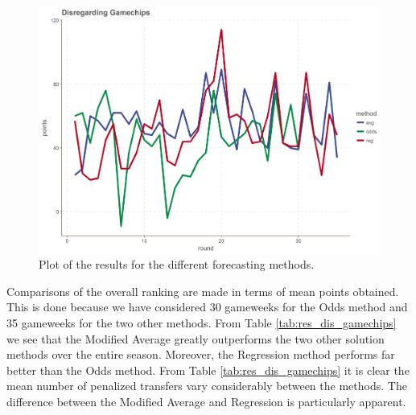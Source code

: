 \begin{figure}[H]
    \centering
    \includegraphics[scale=0.5]{fig/chapter_7/comparison_methods.png}
    \caption{Plot of the results for the different forecasting methods.}
\label{fig:res_comp_dis_gamechips}    
\end{figure}

Comparisons of the overall ranking are made in terms of mean points obtained. This is done because we have considered 30 gameweeks for the Odds method and 35 gameweeks for the two other methods. From Table \ref{tab:res_dis_gamechips} we see that the Modified Average greatly outperforms the two other solution methods over the entire season. Moreover, the Regression method performs far better than the Odds method. From Table \ref{tab:res_dis_gamechips} it is clear the mean number of penalized transfers vary considerably between the methods. The difference between the Modified Average and Regression is particularly apparent. 

\begin{table}[H]
\centering
{}
\caption{Results disregarding gamechips.}
\label{tab:res_dis_gamechips}
\end{table}



